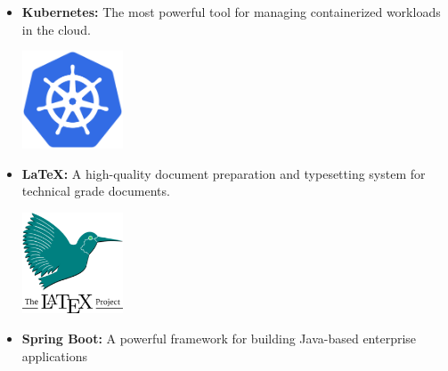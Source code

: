 \begin{itemize}
    \item \textbf{Kubernetes:} \newline The most powerful tool for managing containerized workloads in the cloud. \newline
          \begin{minipage}{\linewidth}
              \centering
              \includegraphics[width=3cm]{src/assets/logos/kubernetes_512x512.png}
          \end{minipage}
    \item \textbf{LaTeX:} \newline \cite{latex-project} A high-quality document preparation and typesetting system for technical grade documents. \newline \newline
          \begin{minipage}{\linewidth}
              \centering
              \includegraphics[width=3cm]{src/assets/logos/latex_200x200.png}
          \end{minipage}
    \item \textbf{Spring Boot:} \newline A powerful framework for building Java-based enterprise applications


\end{itemize}

